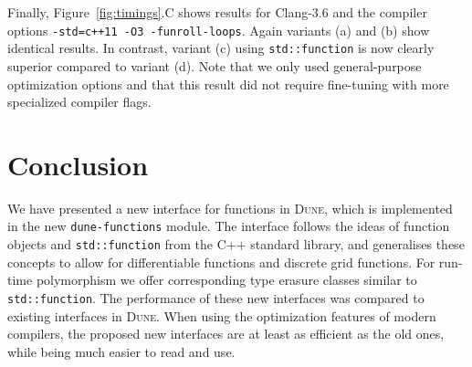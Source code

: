 \documentclass[11pt,
                 numbers=noenddot,
                 headings=normal,
                 DIV16, BCOR10mm]{scrartcl}
\newcommand{\cpp}{\lstinline}
\theoremstyle{remark}
\newcommand{\dune}{\textsc{Dune}\xspace}
\newcommand{\dunemodule}[1]{\texttt{#1}}
\begin{document}
Finally, Figure~\ref{fig:timings}.C shows results for
Clang-3.6 and the compiler options
\texttt{-std=c++11 -O3 \linebreak -funroll-loops}. Again variants (a) and (b) show identical results.
In contrast, variant (c) using \cpp{std::function} is now clearly superior compared
to variant (d).
Note that we only used general-purpose optimization options and
that this result did not require fine-tuning with more
specialized compiler flags.

\section{Conclusion}
We have presented a new interface for functions in \dune, which is implemented in the new
\dunemodule{dune-functions} module. The interface follows the
ideas of function objects and \cpp{std::function} from the C++ standard library, and generalises these concepts to allow for
differentiable functions and discrete grid functions.
For run-time polymorphism we offer corresponding type erasure classes
similar to \cpp{std::function}. The performance of these new
interfaces was compared to existing interfaces in \dune.
When using the optimization features of modern compilers, the proposed new interfaces
are at least as efficient as the old ones, while being much easier to read and use.



\end{document}
